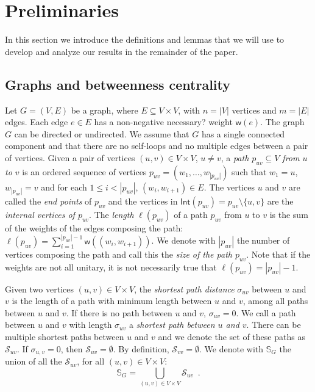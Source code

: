 \section{Preliminaries}\label{sec:prelims}
In this section we introduce the definitions and lemmas that we will use to
develop and analyze our results in the remainder of the paper.

\subsection{Graphs and betweenness centrality}\label{sec:graphprelims}
Let $G=(V,E)$ be a graph, where $E\subseteq V\times V$, with $n=|V|$ vertices
and $m=|E|$ edges. Each edge
$e\in E$ has a non-negative \XXX necessary? weight $\mathsf{w}(e)$. The graph
$G$ can be directed or undirected. We assume
that $G$ has a single connected component and that there are no self-loops and no multiple edges
between a pair of vertices. Given a pair of vertices $(u,v)\in V\times V$,
$u\neq v$, a \emph{path $p_{uv}\subseteq V$ from $u$ to $v$} is an ordered sequence of
vertices $p_{uv}=(w_1,\dotsc,w_{|p_{uv}|})$ such that $w_1=u$, $w_{|p_{uv}|}=v$ and
for each $1\le i < |p_{uv}|$, $(w_i,w_{i+1})\in E$. The vertices $u$ and $v$ are
called the \emph{end points} of $p_{uv}$ and the vertices in
$\mathsf{Int}(p_{uv})=p_{uv}\setminus\{u,v\}$ are the \emph{internal vertices of
$p_{uv}$}. The \emph{length}
$\ell(p_{uv})$ of a path $p_{uv}$ from $u$ to $v$ is the sum of the weights of
the edges composing the path:
$\ell(p_{uv})=\sum_{i=1}^{|p_{uv}|-1}\mathsf{w}((w_i,w_{i+1}))$. We denote with
$|p_{uv}|$ the number of vertices composing the path and call this the
\emph{size of the path $p_{uv}$}. Note that if the weights are not all unitary,
it is not necessarily true that $\ell(p_{uv})=|p_{uv}|-1$.

Given two vertices $(u,v)\in V\times V$, the \emph{shortest path distance}
$\sigma_{uv}$ between $u$ and $v$ is the length of a path with minimum length
between $u$ and $v$, among all paths between $u$ and $v$. If there is no path
between $u$ and $v$, $\sigma_{uv}=0$. We call a path between $u$ and $v$ with
length $\sigma_{uv}$ a \emph{shortest path between $u$ and $v$}. There can be
multiple shortest paths between $u$ and $v$ and we denote the set of these paths
as $\mathcal{S}_{uv}$. If $\sigma_{u,v}=0$, then $\mathcal{S}_{uv}=\emptyset$.
By definition, $\mathcal{S}_{vv}=\emptyset$.
We denote with $\mathbb{S}_G$ the union of all the $\mathcal{S}_{uv}$, for all
$(u,v)\in V\times V$: 
\[ \mathbb{S}_G=\bigcup_{(u,v)\in V\times V}\mathcal{S}_{uv}\enspace.\]

